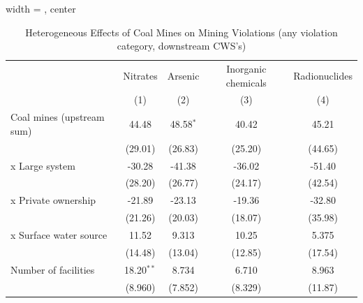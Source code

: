 
\begin{table}[htbp]
   
   \caption{\label{tab:2sls_het_unified_minevio_ivsum_allcat} Heterogeneous Effects of Coal Mines on Mining Violations (any violation category, downstream CWS's)}
   \bigskip
   
   \centering
   
   \begin{adjustbox}{width = \textwidth, center}
      
      
      \begin{tabular}{lcccc}
         \toprule
         
                                                       & Nitrates      & Arsenic       & Inorganic chemicals & Radionuclides\\  
         
                                                       & (1)           & (2)           & (3)                 & (4)\\  
         
         \midrule 
         Coal mines (upstream sum)                     & 44.48         & 48.58$^{*}$   & 40.42               & 45.21\\   
                                                       & (29.01)       & (26.83)       & (25.20)             & (44.65)\\   
           x Large system                              & -30.28        & -41.38        & -36.02              & -51.40\\   
                                                       & (28.20)       & (26.77)       & (24.17)             & (42.54)\\   
           x Private ownership                         & -21.89        & -23.13        & -19.36              & -32.80\\   
                                                       & (21.26)       & (20.03)       & (18.07)             & (35.98)\\   
           x Surface water source                      & 11.52         & 9.313         & 10.25               & 5.375\\   
                                                       & (14.48)       & (13.04)       & (12.85)             & (17.54)\\   
         Number of facilities                          & 18.20$^{**}$  & 8.734         & 6.710               & 8.963\\   
                                                       & (8.960)       & (7.852)       & (8.329)             & (11.87)\\   
         

\end{tabular}
\end{adjustbox}
\end{table}
